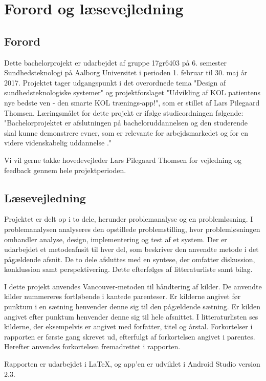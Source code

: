 \chapter*{Forord og læsevejledning}

\section*{Forord}
Dette bachelorprojekt er udarbejdet af gruppe 17gr6403 på 6. semester Sundhedsteknologi på Aalborg Universitet i perioden 1. februar til 30. maj år 2017. Projektet tager udgangspunkt i det overordnede tema "Design af sundhedsteknologiske systemer"  og projektforslaget "Udvikling af KOL patientens nye bedste ven - den smarte KOL trænings-app!", som er stillet af Lars Pilegaard Thomsen. 
Læringsmålet for dette projekt er ifølge studieordningen følgende: "Bachelorprojektet er afslutningen på bacheloruddannelsen og den studerende skal kunne demonstrere evner, som er relevante for arbejdsmarkedet og for en videre videnskabelig uddannelse \cite{Studieordning2014}."

Vi vil gerne takke hovedevejleder Lars Pilegaard Thomsen for vejledning og feedback gennem hele projektperioden.

\section*{Læsevejledning}
Projektet er delt op i to dele, herunder problemanalyse og en problemløsning. I problemanalysen analyseres den opstillede problemstilling, hvor problemløsningen omhandler analyse, design, implementering og test af et system. Der er udarbejdet et metodeafnsit til hver del, som beskriver den anvendte metode i det pågældende afsnit. De to dele afsluttes med en syntese, der omfatter diskussion, konklussion samt perspektivering. Dette efterfølges af litteraturliste samt bilag. 

I dette projekt anvendes Vancouver-metoden til håndtering af kilder. De anvendte kilder nummereres fortløbende i kantede parenteser. Er kilderne angivet før punktum i en sætning henvender denne sig til den pågældende sætning. Er kilden angivet efter punktum henvender denne sig til hele afsnittet. I litteraturlisten ses kilderne, der eksempelvis er angivet med forfatter, titel og årstal. Forkortelser i rapporten er første gang skrevet ud, efterfulgt af forkortelsen angivet i parentes. Herefter anvendes forkortelsen fremadrettet i rapporten.

Rapporten er udarbejdet i \LaTeX, og app'en er udviklet i Android Studio version 2.3.